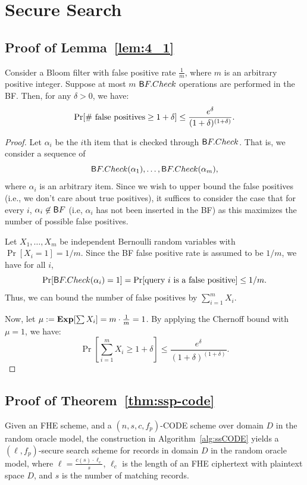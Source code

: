\section{Secure Search}
\subsection{Proof of Lemma~\ref{lem:4_1}}\label{app:proof41}

\begin{lemma}[4.1]
Consider a Bloom filter with false positive rate $\frac{1}{m}$, where
$m$ is an arbitrary positive integer. Suppose at most $m$ $\sf BF.Check$ operations
are performed in the BF.
%
Then, for any $\delta > 0$, we have:
$$\Pr [ \mbox{\rm \# false positives} \ge 1+\delta] 
  \le {\frac {e^\delta} {(1+\delta)^{(1+\delta)}}}.$$ 
\end{lemma}
\begin{proof}
Let $\alpha_i$ be the $i$th item that is checked through $\sf
BF.Check$. That is, we consider a sequence of $${\sf
BF.Check}(\alpha_1), \ldots, {\sf BF.Check}(\alpha_{m}),$$
where $\alpha_i$ is an arbitrary item. 
Since we wish to upper bound the false positives (i.e., we don't care about true
positives), it suffices to consider the
case that for every $i$, 
$\alpha_i \not \in {\sf BF}$ (i.e, $\alpha_i$ has not been inserted in the
BF) as this maximizes the number of possible false positives.

Let $X_1, \ldots, X_m$ be independent Bernoulli random variables with
$\Pr[X_i = 1] = 1/m$. 
%
Since the BF false positive rate is assumed to be $1/m$, we have
for all $i$, 
$$\Pr[{\sf BF.Check}(\alpha_i)=1] = \Pr[\mbox{query $i$ is a false positive}] \le
1/m.$$
Thus, we can bound the number of false positives
by $\sum_{i=1}^m X_i$.

Now, let $\mu :=
\Exp[\sum X_i] = m \cdot \frac 1 m = 1$.  By applying the Chernoff bound with $\mu =
1$,  we have: 
%
$$ \Pr\left[\sum_{i=1}^m X_i \ge 1 + \delta \right]  
\le {\frac {e^\delta} {(1+\delta)^{(1+\delta)}}} .$$
\end{proof}


\subsection{Proof of Theorem~\ref{thm:ssp-code}}\label{app:proof63}

\begin{theorem}[6.3]%
Given an FHE scheme, and a $(n, s, c, f_p)$-CODE scheme over domain $D$
in the random oracle model, the construction in Algorithm~\ref{alg:ssCODE} yields a $(\ell,
f_p)$-secure search scheme for records in domain $D$ in the random oracle
model, where $\ell = \frac{c(s)\cdot \ell_c}{s}$, $\ell_c$ is the length
of an FHE ciphertext with plaintext space $D$, and $s$ is the number of
matching records.
\end{theorem}

